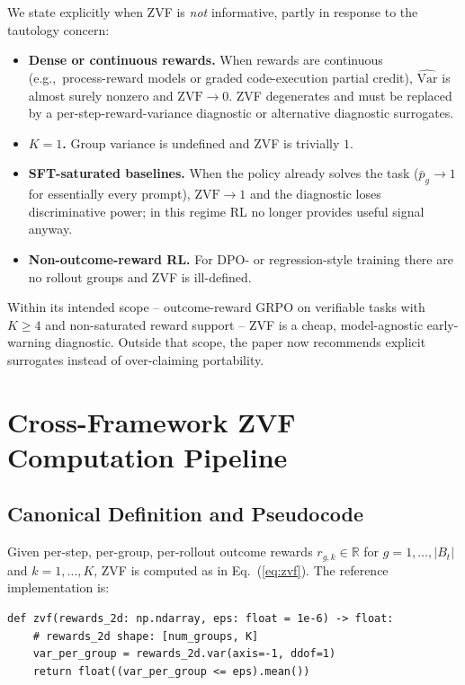 \documentclass{article}
\begin{document}
We state explicitly when ZVF is \emph{not} informative, partly in response
to the tautology concern:
\begin{itemize}[leftmargin=1.2em,itemsep=0pt]
  \item \textbf{Dense or continuous rewards.} When rewards are continuous
        (e.g.,~process-reward models or graded code-execution partial credit),
        $\widehat{\mathrm{Var}}$ is almost surely nonzero and
        $\mathrm{ZVF} \to 0$. ZVF degenerates and must be replaced by a
        per-step-reward-variance diagnostic or alternative diagnostic surrogates.
  \item \textbf{$K=1$.} Group variance is undefined and ZVF is trivially $1$.
  \item \textbf{SFT-saturated baselines.} When the policy already solves
        the task ($\bar p_g \to 1$ for essentially every prompt),
        $\mathrm{ZVF} \to 1$ and the diagnostic loses discriminative power;
        in this regime RL no longer provides useful signal anyway.
  \item \textbf{Non-outcome-reward RL.} For DPO- or regression-style
        training there are no rollout groups and ZVF is ill-defined.
\end{itemize}
Within its intended scope -- outcome-reward GRPO on verifiable tasks with
$K \ge 4$ and non-saturated reward support -- ZVF is a cheap, model-agnostic
early-warning diagnostic. Outside that scope, the paper now recommends
explicit surrogates instead of over-claiming portability.
 \begingroup
\newcommand{\artifactstatusword}{anonymous}
\providecommand{\artifactstatusword}{released}
\section{Cross-Framework ZVF Computation Pipeline}
\label{sec:appendix:zvf-pipeline}

\subsection{Canonical Definition and Pseudocode}

Given per-step, per-group, per-rollout outcome rewards
$r_{g,k} \in \mathbb{R}$ for $g=1,\ldots,|B_t|$ and $k=1,\ldots,K$, ZVF
is computed as in Eq.~(\ref{eq:zvf}). The reference implementation is:
\begin{verbatim}
def zvf(rewards_2d: np.ndarray, eps: float = 1e-6) -> float:
    # rewards_2d shape: [num_groups, K]
    var_per_group = rewards_2d.var(axis=-1, ddof=1)
    return float((var_per_group <= eps).mean())
\end{verbatim}
\end{document}
